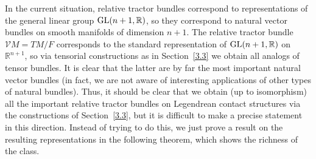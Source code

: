 \documentclass[pdftex]{sigma}
\numberwithin{equation}{section}
\def\Bbb{\mathbb}
\def\Cal{\mathcal}
\begin{document}
In the current situation, relative tractor bundles correspond to representations of
the general linear group ${\rm GL}(n+1,\Bbb R)$, so they correspond to natural vector
bundles on smooth manifolds of dimension $n+1$. The relative tractor bundle
$\Cal VM=TM/F$ corresponds to the standard representation of ${\rm GL}(n+1,\Bbb R)$ on
$\Bbb R^{n+1}$, so via tensorial constructions as in Section~\ref{3.3} we obtain all
analogs of tensor bundles. It is clear that the latter are by far the most important
natural vector bundles (in fact, we are not aware of interesting applications of
other types of natural bundles). Thus, it should be clear that we obtain (up to
isomorphism) all the important relative tractor bundles on Legendrean contact
structures via the constructions of Section~\ref{3.3}, but it is difficult to make a
precise statement in this direction. Instead of trying to do this, we just prove a
result on the resulting representations in the following theorem, which shows the
richness of the class.
\end{document}
